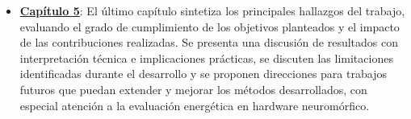 \begin{itemize}
    \item\textbf{\hyperref[chap:conclusiones]{Capítulo 5}}: El último capítulo sintetiza los principales hallazgos del trabajo, evaluando el grado de cumplimiento de los objetivos planteados y el impacto de las contribuciones realizadas. Se presenta una discusión de resultados con interpretación técnica e implicaciones prácticas, se discuten las limitaciones identificadas durante el desarrollo y se proponen direcciones para trabajos futuros que puedan extender y mejorar los métodos desarrollados, con especial atención a la evaluación energética en hardware neuromórfico.
\end{itemize}







